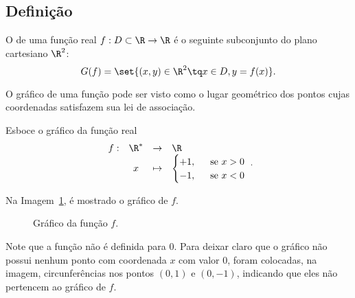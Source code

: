 \subsection{Definição}

\begin{definition}
    O  de uma função real $f : D \subset \R \to \R$ é o seguinte subconjunto do plano
cartesiano $\R^2$: $$G(f) = \set{(x,y) \in \R^2 \tq x \in D , y =
f(x)}.$$
\end{definition}

\begin{remark}
    O gráfico de uma função pode ser visto como o lugar geométrico
dos pontos cujas coordenadas satisfazem sua lei de associação.
\end{remark}

\begin{example}
    Esboce o gráfico da função real
    $$\begin{array}{cccl}
    f : & \R^\ast & \to     & \R \\
        &  x & \mapsto & \begin{cases}
                            +1,  &  \ \text{ se } x >0 \\
                            -1, &  \ \text{ se } x <0
                            \end{cases}
    \end{array}.$$
\end{example}

\begin{solution}
    Na Imagem~\ref{img:grafico-funcao-zeroum}, é mostrado o gráfico de $f$.

    \begin{figure}[ht]
    \centering
        
    \caption{Gráfico da função $f$.}
    \label{img:grafico-funcao-zeroum}
    \end{figure}

    Note que a função não é definida para 0.
    Para deixar claro que o gráfico não possui nenhum ponto com coordenada $x$ com valor $0$, foram colocadas, na imagem, circunferências nos pontos $(0,1)$ e $(0,-1)$, indicando que eles não pertencem ao gráfico de $f$.
\end{solution}
